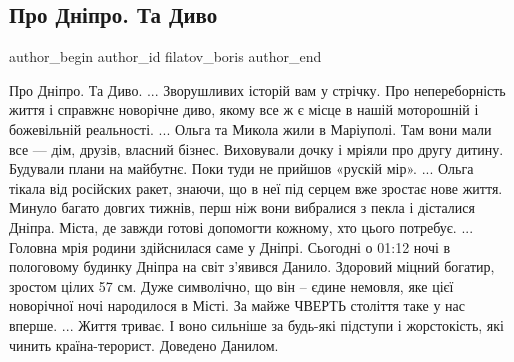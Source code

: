  
 
 
 
 
 
\subsection{Про Дніпро. Та Диво}
\label{sec:01_01_2023.fb.filatov_boris.1.dnipro_ta_dyvo}
 
\ifcmt
 author_begin
   author_id filatov_boris
 author_end
\fi

\obeycr
Про Дніпро.
Та Диво.
...
Зворушливих історій вам у стрічку. 
Про непереборність життя і справжнє новорічне диво, якому все ж є місце в нашій моторошній і божевільній реальності. 
...
Ольга та Микола жили в Маріуполі. Там вони мали все — дім, друзів, власний бізнес. 
Виховували дочку і мріяли про другу дитину. 
Будували плани на майбутнє. 
Поки туди не прийшов «рускій мір». 
...
Ольга тікала від російских ракет, знаючи, що в неї під серцем вже зростає нове життя. 
Минуло багато довгих тижнів, перш ніж вони вибралися з пекла і дісталися Дніпра.
Міста, де завжди готові допомогти кожному, хто цього потребує.
...
Головна мрія родини здійснилася саме у Дніпрі. 
Сьогодні о 01:12 ночі в пологовому будинку Дніпра на світ з'явився Данило. 
Здоровий міцний богатир, зростом цілих 57 см. 
Дуже символічно, що він – єдине немовля, яке цієї новорічної ночі народилося в Місті. 
За майже ЧВЕРТЬ століття таке у нас вперше.
...
Життя триває. 
І воно сильніше за будь-які підступи і жорстокість, які чинить країна-терорист. 
Доведено Данилом.
\restorecr
